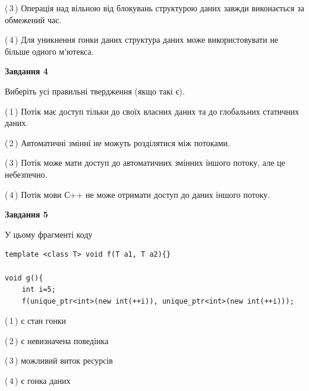 \documentclass[12pt, ukrainian]{article}
\begin{document}
\begin {large}
{(\,3\,) Операція над вільною від блокувань структурою даних завжди виконається за обмежений час.%

(\,4\,) Для уникнення гонки даних структура даних може використовувати не більше одного м’ютекса.%



\begin{center}
\textbf{Завдання 4}
\end{center}
Виберіть усі правильні твердження (якщо такі є).\par
\vspace{2mm}

(\,1\,) Потік має доступ тільки до своїх власних даних та до глобальних статичних даних.%

(\,2\,) Автоматичні змінні не можуть розділятися між потоками.%

(\,3\,) Потік може мати доступ до автоматичних змінних іншого потоку, але це небезпечно.%

(\,4\,) Потік мови С++ не може отримати доступ до даних іншого потоку.%



\begin{center}
\textbf{Завдання 5}
\end{center}
У цьому фрагменті коду
\begin{verbatim}
template <class T> void f(T a1, T a2){}

void g(){
    int i=5;
    f(unique_ptr<int>(new int(++i)), unique_ptr<int>(new int(++i)));
\end{verbatim}

(\,1\,) є стан гонки%

(\,2\,) є невизначена поведінка%

(\,3\,) можливий виток ресурсів%

(\,4\,) є гонка даних%


}
\end {large}
\end{document}
